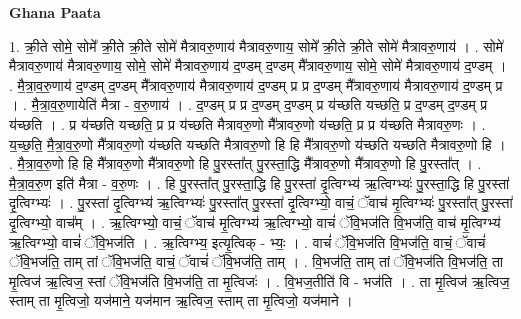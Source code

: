 \documentclass[17pt]{extarticle}
\begin{document}
\textbf{Ghana Paata } \newline

1. क्री॒ते सोमे॒ सोमे᳚ क्री॒ते क्री॒ते सोमे॑ मैत्रावरु॒णाय॑ मैत्रावरु॒णाय॒ सोमे᳚ क्री॒ते क्री॒ते सोमे॑ मैत्रावरु॒णाय॑ । . सोमे॑ मैत्रावरु॒णाय॑ मैत्रावरु॒णाय॒ सोमे॒ सोमे॑ मैत्रावरु॒णाय॑ द॒ण्डम् द॒ण्डम् मै᳚त्रावरु॒णाय॒ सोमे॒ सोमे॑ मैत्रावरु॒णाय॑ द॒ण्डम् । . मै॒त्रा॒व॒रु॒णाय॑ द॒ण्डम् द॒ण्डम् मै᳚त्रावरु॒णाय॑ मैत्रावरु॒णाय॑ द॒ण्डम् प्र प्र द॒ण्डम् मै᳚त्रावरु॒णाय॑ मैत्रावरु॒णाय॑ द॒ण्डम् प्र । . मै॒त्रा॒व॒रु॒णायेति॑ मैत्रा - व॒रु॒णाय॑ । . द॒ण्डम् प्र प्र द॒ण्डम् द॒ण्डम् प्र य॑च्छति यच्छति॒ प्र द॒ण्डम् द॒ण्डम् प्र य॑च्छति । . प्र य॑च्छति यच्छति॒ प्र प्र य॑च्छति मैत्रावरु॒णो मै᳚त्रावरु॒णो य॑च्छति॒ प्र प्र य॑च्छति मैत्रावरु॒णः । . य॒च्छ॒ति॒ मै॒त्रा॒व॒रु॒णो मै᳚त्रावरु॒णो य॑च्छति यच्छति मैत्रावरु॒णो हि हि मै᳚त्रावरु॒णो य॑च्छति यच्छति मैत्रावरु॒णो हि । . मै॒त्रा॒व॒रु॒णो हि हि मै᳚त्रावरु॒णो मै᳚त्रावरु॒णो हि पु॒रस्ता᳚त् पु॒रस्ता॒द्धि मै᳚त्रावरु॒णो मै᳚त्रावरु॒णो हि पु॒रस्ता᳚त् । . मै॒त्रा॒व॒रु॒ण इति॑ मैत्रा - व॒रु॒णः । . हि पु॒रस्ता᳚त् पु॒रस्ता॒द्धि हि पु॒रस्ता॑ दृ॒त्विग्भ्य॑ ऋ॒त्विग्भ्यः॑ पु॒रस्ता॒द्धि हि पु॒रस्ता॑ दृ॒त्विग्भ्यः॑ । . पु॒रस्ता॑ दृ॒त्विग्भ्य॑ ऋ॒त्विग्भ्यः॑ पु॒रस्ता᳚त् पु॒रस्ता॑ दृ॒त्विग्भ्यो॒ वाचं॒ ॅवाच॑ मृ॒त्विग्भ्यः॑ पु॒रस्ता᳚त् पु॒रस्ता॑ दृ॒त्विग्भ्यो॒ वाच᳚म् । . ऋ॒त्विग्भ्यो॒ वाचं॒ ॅवाच॑ मृ॒त्विग्भ्य॑ ऋ॒त्विग्भ्यो॒ वाचं॑ ॅवि॒भज॑ति वि॒भज॑ति॒ वाच॑ मृ॒त्विग्भ्य॑ ऋ॒त्विग्भ्यो॒ वाचं॑ ॅवि॒भज॑ति । . ऋ॒त्विग्भ्य॒ इत्यृ॒त्विक् - भ्यः॒ । . वाचं॑ ॅवि॒भज॑ति वि॒भज॑ति॒ वाचं॒ ॅवाचं॑ ॅवि॒भज॑ति॒ ताम् तां ॅवि॒भज॑ति॒ वाचं॒ ॅवाचं॑ ॅवि॒भज॑ति॒ ताम् । . वि॒भज॑ति॒ ताम् तां ॅवि॒भज॑ति वि॒भज॑ति॒ ता मृ॒त्विज॑ ऋ॒त्विज॒ स्तां ॅवि॒भज॑ति वि॒भज॑ति॒ ता मृ॒त्विजः॑ । . वि॒भज॒तीति॑ वि - भज॑ति । . ता मृ॒त्विज॑ ऋ॒त्विज॒ स्ताम् ता मृ॒त्विजो॒ यज॑माने॒ यज॑मान ऋ॒त्विज॒ स्ताम् ता मृ॒त्विजो॒ यज॑माने । \newline
\end{document}
